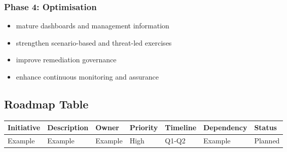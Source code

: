 \documentclass[
  letterpaper,
  DIV=11,
  numbers=noendperiod]{scrartcl}
\providecommand{\tightlist}{%
  \setlength{\itemsep}{0pt}\setlength{\parskip}{0pt}}
\begin{document}
\subsubsection{Phase 4: Optimisation}\label{phase-4-optimisation}

\begin{itemize}
\tightlist
\item
  mature dashboards and management information
\item
  strengthen scenario-based and threat-led exercises
\item
  improve remediation governance
\item
  enhance continuous monitoring and assurance
\end{itemize}

\subsection{Roadmap Table}\label{roadmap-table}

\begin{longtable}[]{@{}
  >{\raggedright\arraybackslash}p{}
  >{\raggedright\arraybackslash}p{}
  >{\raggedright\arraybackslash}p{}
  >{\raggedright\arraybackslash}p{}
  >{\raggedright\arraybackslash}p{}
  >{\raggedright\arraybackslash}p{}
  >{\raggedright\arraybackslash}p{}@{}}
\toprule\noalign{}
\begin{minipage}[b]{\linewidth}\raggedright
Initiative
\end{minipage} & \begin{minipage}[b]{\linewidth}\raggedright
Description
\end{minipage} & \begin{minipage}[b]{\linewidth}\raggedright
Owner
\end{minipage} & \begin{minipage}[b]{\linewidth}\raggedright
Priority
\end{minipage} & \begin{minipage}[b]{\linewidth}\raggedright
Timeline
\end{minipage} & \begin{minipage}[b]{\linewidth}\raggedright
Dependency
\end{minipage} & \begin{minipage}[b]{\linewidth}\raggedright
Status
\end{minipage} \\
\midrule\noalign{}
\endhead
\bottomrule\noalign{}
\endlastfoot
Example & Example & Example & High & Q1-Q2 & Example & Planned \\
\end{longtable}
\end{document}
